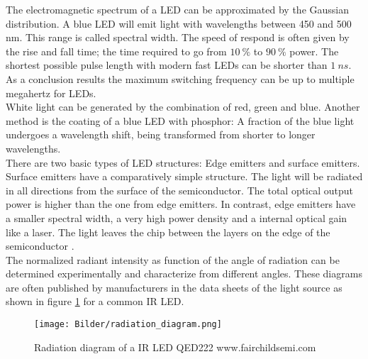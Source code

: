 The electromagnetic spectrum of a LED can be approximated by the Gaussian distribution. A blue LED will emit light with wavelengths between 450 and 500 nm. This range is called spectral width. The speed of respond is often given by the rise and fall time; the time required to go from  $10~\%$ to $90~\%$ power. The shortest possible pulse length with modern fast LEDs can be shorter than $1~ns$. As a conclusion results the maximum switching frequency can be up to multiple megahertz for LEDs.\\   
White light can be generated by the combination of red, green and blue. Another method is the coating of a blue LED with phosphor: A fraction of the blue light undergoes a wavelength shift, being transformed from shorter to longer wavelengths.\\

There are two basic types of LED structures: Edge emitters and surface emitters. Surface emitters have a comparatively simple structure. The light will be radiated in all directions from the surface of the semiconductor. The total optical output power is higher than the one from edge emitters. In contrast, edge emitters have a smaller spectral width, a very high power density and a internal optical gain like a laser. The light leaves the chip between the layers on the edge of the semiconductor \cite{botez1979comparison}.\\

The normalized radiant intensity as function of the angle of radiation can be determined experimentally and characterize from different angles. These diagrams are often published by manufacturers in the data sheets of the light source as shown in figure \ref{fig:radiation_diagram} for a common IR LED. \\

\begin{figure} [!h]
	\centering
	\texttt{[image: Bilder/radiation\_diagram.png]}
	\caption{Radiation diagram of a IR LED \tiny QED222 www.fairchildsemi.com}
	\label{fig:radiation_diagram}
\end{figure}

\newpage

